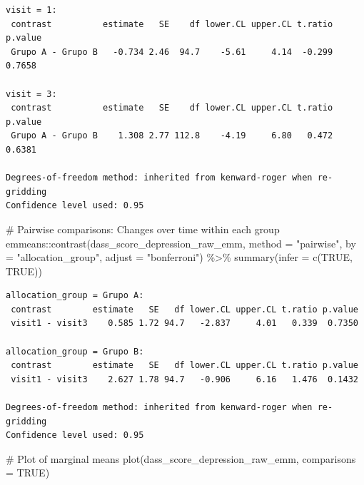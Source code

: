\documentclass[
  letterpaper,
  DIV=11,
  numbers=noendperiod]{scrartcl}
\newenvironment{Shaded}{\begin{snugshade}}{\end{snugshade}}
\newcommand{\AttributeTok}[1]{\textcolor[rgb]{0.40,0.45,0.13}{#1}}
\newcommand{\CommentTok}[1]{\textcolor[rgb]{0.37,0.37,0.37}{#1}}
\newcommand{\ConstantTok}[1]{\textcolor[rgb]{0.56,0.35,0.01}{#1}}
\newcommand{\FunctionTok}[1]{\textcolor[rgb]{0.28,0.35,0.67}{#1}}
\newcommand{\NormalTok}[1]{\textcolor[rgb]{0.00,0.23,0.31}{#1}}
\newcommand{\SpecialCharTok}[1]{\textcolor[rgb]{0.37,0.37,0.37}{#1}}
\newcommand{\StringTok}[1]{\textcolor[rgb]{0.13,0.47,0.30}{#1}}
\begin{document}
\begin{verbatim}
visit = 1:
 contrast          estimate   SE    df lower.CL upper.CL t.ratio p.value
 Grupo A - Grupo B   -0.734 2.46  94.7    -5.61     4.14  -0.299  0.7658

visit = 3:
 contrast          estimate   SE    df lower.CL upper.CL t.ratio p.value
 Grupo A - Grupo B    1.308 2.77 112.8    -4.19     6.80   0.472  0.6381

Degrees-of-freedom method: inherited from kenward-roger when re-gridding 
Confidence level used: 0.95 
\end{verbatim}

\begin{Shaded}
\begin{Highlighting}[]
\CommentTok{\# Pairwise comparisons: Changes over time within each group}
\NormalTok{emmeans}\SpecialCharTok{::}\FunctionTok{contrast}\NormalTok{(dass\_score\_depression\_raw\_emm, }\AttributeTok{method =} \StringTok{"pairwise"}\NormalTok{, }\AttributeTok{by =} \StringTok{"allocation\_group"}\NormalTok{, }\AttributeTok{adjust =} \StringTok{"bonferroni"}\NormalTok{) }\SpecialCharTok{\%\textgreater{}\%} \FunctionTok{summary}\NormalTok{(}\AttributeTok{infer =} \FunctionTok{c}\NormalTok{(}\ConstantTok{TRUE}\NormalTok{, }\ConstantTok{TRUE}\NormalTok{))}
\end{Highlighting}
\end{Shaded}

\begin{verbatim}
allocation_group = Grupo A:
 contrast        estimate   SE   df lower.CL upper.CL t.ratio p.value
 visit1 - visit3    0.585 1.72 94.7   -2.837     4.01   0.339  0.7350

allocation_group = Grupo B:
 contrast        estimate   SE   df lower.CL upper.CL t.ratio p.value
 visit1 - visit3    2.627 1.78 94.7   -0.906     6.16   1.476  0.1432

Degrees-of-freedom method: inherited from kenward-roger when re-gridding 
Confidence level used: 0.95 
\end{verbatim}

\begin{Shaded}
\begin{Highlighting}[]
\CommentTok{\# Plot of marginal means}
\FunctionTok{plot}\NormalTok{(dass\_score\_depression\_raw\_emm, }\AttributeTok{comparisons =} \ConstantTok{TRUE}\NormalTok{)}
\end{Highlighting}
\end{Shaded}
\end{document}

